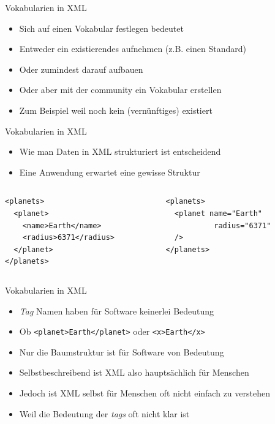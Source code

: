 \documentclass{beamer}
\begin{document}
\begin{frame}{Vokabularien in XML}
	
	\begin{itemize}
		\item Sich auf einen Vokabular festlegen bedeutet
		\item Entweder ein existierendes aufnehmen (z.B. einen Standard)
		\item Oder zumindest darauf aufbauen
		\item Oder aber mit der community ein Vokabular erstellen
		\item Zum Beispiel weil noch kein (vernünftiges) existiert
	\end{itemize}
	
\end{frame}

\begin{frame}[fragile]{Vokabularien in XML}
	
	\begin{itemize}
		\item Wie man Daten in XML strukturiert ist entscheidend
		\item Eine Anwendung erwartet eine gewisse Struktur
	\end{itemize}
	
	\begin{columns}[T] %
		\begin{column}{.52\textwidth}
			\begin{lstlisting}
<planets>
  <planet>
    <name>Earth</name>
    <radius>6371</radius>
  </planet>
</planets>
			\end{lstlisting}
		\end{column}%
		\hfill%
		\begin{column}{.44\textwidth}
			\begin{lstlisting}
<planets>
  <planet name="Earth" 
           radius="6371" 
  />
</planets>
			\end{lstlisting}
		\end{column}%
	\end{columns}
	
\end{frame}

\begin{frame}{Vokabularien in XML}
	
	\begin{itemize}
		\item \emph{Tag} Namen haben für Software keinerlei Bedeutung
		\item Ob \texttt{<planet>Earth</planet>} oder \texttt{<x>Earth</x>}
		\item Nur die Baumstruktur ist für Software von Bedeutung
		\item Selbstbeschreibend ist XML also hauptsächlich für Menschen
		\item Jedoch ist XML selbst für Menschen oft nicht einfach zu verstehen
		\item Weil die Bedeutung der \emph{tags} oft nicht klar ist
	\end{itemize}
	
\end{frame}
\end{document}
